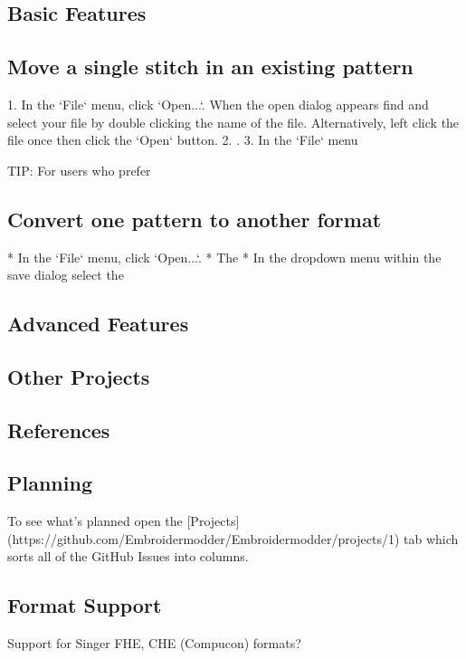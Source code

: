 \documentclass[11pt]{report}
\begin{document}
\subsection{Basic Features}

\subsection{Move a single stitch in an existing pattern}

1. In the `File` menu, click `Open...`. When the open dialog appears find and select your file by double clicking the name of the file. Alternatively, left click the file once then click the `Open` button.
2. .
3. In the `File` menu

TIP: For users who prefer

\subsection{Convert one pattern to another format}

* In the `File` menu, click `Open...`.
* The
* In the dropdown menu within the save dialog select the

\subsection{Advanced Features}

\subsection{Other Projects}

\subsection{References}

\subsection{Planning}

To see what's planned open the
[Projects](https://github.com/Embroidermodder/Embroidermodder/projects/1)
tab which sorts all of the GitHub Issues into columns.

\subsection{Format Support}

Support for Singer FHE, CHE (Compucon) formats?
\end{document}
